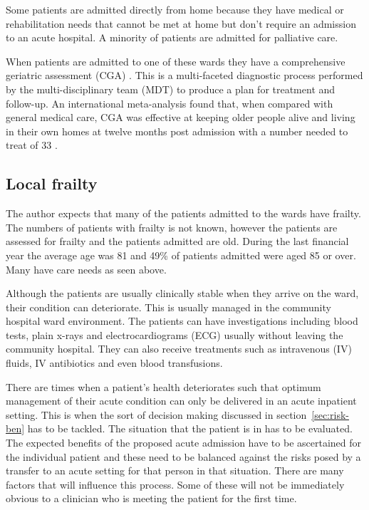 \documentclass
[
	12pt,
	a4paper,
	oneside,
]{report}
\begin{document}
Some patients are admitted directly from home because they have medical or rehabilitation
needs that cannot be met at home but don't require an admission to an acute hospital.
A minority of patients are admitted for palliative care.

When patients are admitted to one of these wards they have a comprehensive geriatric 
assessment (CGA) \parencite{bgs:14}. This is a multi-faceted diagnostic process
performed by the multi-disciplinary team (MDT) to produce a plan for treatment 
and follow-up.
An international meta-analysis found that, when compared with general medical care,
CGA was effective at keeping older people alive and living in their own homes at
twelve months post admission with a number needed to treat of 33 \parencite{ellis:11}.

\subsection{Local frailty}

The author expects that many of the patients admitted to the wards have frailty.
The numbers of patients with frailty is not known, however the patients are assessed 
for frailty and the patients admitted are old. During the last financial year the
average age was 81 and 49\% of patients admitted were aged 85 or over. Many have 
care needs as seen above.

Although the patients are usually clinically stable when they arrive on the ward,
their condition can deteriorate. This is usually managed in the community hospital
ward environment. The patients can have investigations including blood tests, plain
x-rays and electrocardiograms (ECG) usually without leaving the community hospital.
They can also receive treatments such as intravenous (IV) fluids, IV antibiotics
and even blood transfusions.

There are times when a patient's health deteriorates such that optimum 
management of their
acute condition can only be delivered in an acute inpatient setting. This is when 
the sort of decision making discussed in section~\ref{sec:risk-ben} has
to be tackled. The situation that the patient is in has to be evaluated. The 
expected benefits of the proposed acute admission have to be ascertained for the
individual patient and these need to be balanced against the risks posed by a transfer
to an acute setting for that person in that situation. There are many factors that 
will influence this process. Some of these will not be immediately obvious to a 
clinician who is meeting the patient for the first time.
\end{document}
